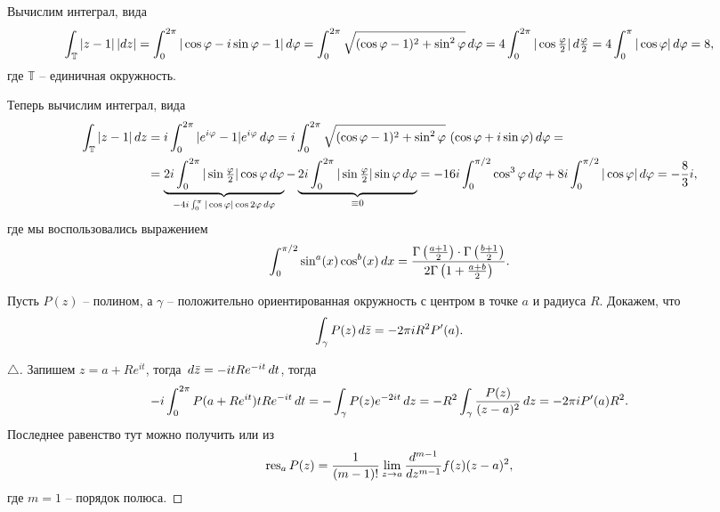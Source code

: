 
Вычислим интеграл, вида
\begin{equation*}
    \int_{\mathbb{T}} |z-1| \, |dz| = 
    \int_{0}^{2 \pi} |\cos \varphi - i \sin \varphi - 1| \, d \varphi
    =
    \int_{0}^{2\pi} \sqrt{(\cos \varphi - 1)^2 + \sin^2 \varphi} \, d \varphi = 
    4 \int_{0}^{2\pi} |\cos \tfrac{\varphi}{2} | \, d \tfrac{\varphi}{2} = 
    4 \int_{0}^{\pi}  |\cos \varphi| \, d \varphi = 8
    ,
\end{equation*}
где $\mathbb{T}$ -- единичная окружность.

Теперь вычислим интеграл, вида
\begin{align*}
    \int_{\mathbb{T}} |z-1| \, dz &= 
    i \int_{0}^{2\pi} |e^{i \varphi} - 1| e^{i \varphi} \, d \varphi = 
    i \int_{0}^{2 \pi}  \sqrt{(\cos \varphi -1)^2 + \sin^2 \varphi} \ (\cos \varphi + i \sin \varphi) \, d \varphi = 
    \\ &= 
   \underbrace{ 2 i \int_{0}^{2\pi} |\sin \tfrac{\varphi}{2}| \cos \varphi \, d \varphi}_{-4 i \int_0^\pi |\cos \varphi| \cos 2 \varphi \, d \varphi} - \underbrace{2 i \int_{0}^{2\pi} |\sin \tfrac{\varphi}{2}| \sin \varphi \, d \varphi}_{\equiv 0} = - 16 i \int_{0}^{\pi/2}  \cos^3 \varphi \, d \varphi + 8 i \int_{0}^{\pi/2} |\cos \varphi| \, d \varphi 
   = - \frac{8}{3}i,
\end{align*}
где мы воспользовались выражением
\begin{equation*}
    \int_{0}^{\pi/2}  \sin^a(x) \cos^b (x) \, d x = 
    \frac{\Gamma\left(\frac{a+1}{2}\right) \cdot \Gamma\left(\frac{b+1}{2}\right)}{2 \Gamma\left(1 + \frac{a + b}{2}\right)}.
\end{equation*}




Пусть $P(z)$ -- полином, а $\gamma$ -- положительно ориентированная окружность с центром в точке $a$ и радиуса $R$. Докажем, что
\begin{equation*}
    \int_\gamma P(z) \, d \bar{z} = - 2 \pi i R^2 P'(a).
\end{equation*}

\begin{proof}[$\triangle$]
    
Запишем $z = a + R e^{i t}$, тогда $\, d \bar{z} = - i t R e^{- i t} \, d t$, тогда
\begin{equation*}
    - i \int_{0}^{2\pi} P(a + R e^{i t}) t R e^{- i t} \, d t = 
    - \int_\gamma P(z) e^{- 2 i t} \, d z = 
    - R^2 \int_\gamma \frac{ P(z)}{(z-a)^2} \, d z = - 2 \pi i P' (a) R^2.
\end{equation*}
Последнее равенство тут можно получить или из
\begin{equation*}
     \mathop{\mathrm{res}}\nolimits_a P(z) = 
    \frac{1}{(m-1)!}  \lim_{z \to a} \frac{d^{m-1}}{d z^{m-1}} f(z) (z-a)^2,
\end{equation*}
где $m=1$ -- порядок полюса. 

\end{proof}




